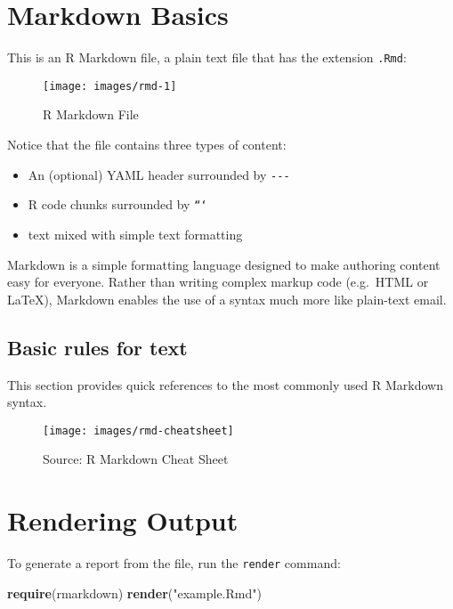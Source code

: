 \documentclass[]{book}
\newenvironment{Shaded}{\begin{snugshade}}{\end{snugshade}}
\newcommand{\KeywordTok}[1]{\textcolor[rgb]{0.13,0.29,0.53}{\textbf{{#1}}}}
\newcommand{\StringTok}[1]{\textcolor[rgb]{0.31,0.60,0.02}{{#1}}}
\newcommand{\NormalTok}[1]{{#1}}
\providecommand{\tightlist}{%
  \setlength{\itemsep}{0pt}\setlength{\parskip}{0pt}}
\def\tightlist{}
\begin{document}
\section{Markdown Basics}\label{markdown-basics}

This is an R Markdown file, a plain text file that has the extension
\texttt{.Rmd}:

\begin{figure}[h]
\texttt{[image: images/rmd-1]} \caption{R Markdown File}\label{fig:g1}
\end{figure}

Notice that the file contains three types of content:

\begin{itemize}
\tightlist
\item
  An (optional) YAML header surrounded by \texttt{-\/-\/-}
\item
  R code chunks surrounded by \texttt{```}
\item
  text mixed with simple text formatting
\end{itemize}

Markdown is a simple formatting language designed to make authoring
content easy for everyone. Rather than writing complex markup code
(e.g.~HTML or LaTeX), Markdown enables the use of a syntax much more
like plain-text email.

\subsection{Basic rules for text}\label{basic-rules-for-text}

This section provides quick references to the most commonly used R
Markdown syntax.

\begin{figure}[h]
\texttt{[image: images/rmd-cheatsheet]} \caption{Source: R Markdown Cheat Sheet}\label{fig:g2}
\end{figure}

\clearpage

\section{Rendering Output}\label{rendering-output}

To generate a report from the file, run the \texttt{render} command:

\begin{Shaded}
\begin{Highlighting}[]
\KeywordTok{require}\NormalTok{(rmarkdown)}
\KeywordTok{render}\NormalTok{(}\StringTok{"example.Rmd"}\NormalTok{)}
\end{Highlighting}
\end{Shaded}
\end{document}
